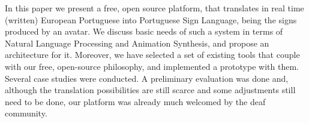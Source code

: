 In this paper we present a free, open source platform, that translates in real time (written) European Portuguese into Portuguese Sign Language, being the signs produced by an avatar. We discuss basic needs of such a system in terms of Natural Language Processing and Animation Synthesis, and propose an architecture for it. Moreover, we have selected a set of existing tools that couple with our free, open-source philosophy, and implemented a prototype with them. Several case studies were conducted. A preliminary evaluation was done and, although the translation possibilities are still scarce and some adjustments still need to be done, our platform was already much welcomed by the deaf community.
